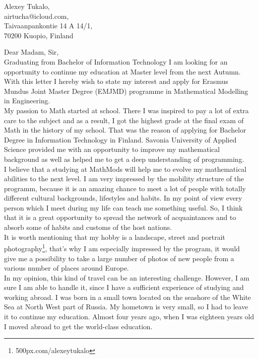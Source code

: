 \documentclass[english]{article}
\date{}
\begin{document}
\begin{flushright}
Alexey Tukalo,\\
airtucha@icloud.com,\\
Taivaanpankontie 14 A 14/1,\\
70200 Kuopio, Finland
\end{flushright}

Dear Madam, Sir,\\ 

Graduating from Bachelor of Information Technology I am looking for an opportunity to continue my education at Master level from the next Autumn. With this letter I hereby wish to state my interest and apply for Erasmus Mundus Joint Master Degree (EMJMD) programme in Mathematical Modelling in Engineering.\\

My passion to Math started at school. There I was inspired to pay a lot of extra care to the subject and as a result, I got the highest grade at the final exam of Math in the history of my school. That was the reason of applying for Bachelor Degree in Information Technology in Finland. Savonia University of Applied Science provided me with an opportunity to improve my mathematical background as well as helped me to get a deep understanding of programming.\\

I believe that a studying at MathMods will help me to evolve my mathematical abilities to the next level. I am very impressed by the mobility structure of the programm, because it is an amazing chance to meet a lot of people with totally different cultural backgrounds, lifestyles and habits. In my point of view every person which I meet during my life can teach me something useful. So, I think that it is a great opportunity to spread the network of acquaintances and to absorb some of habits and customs of the host nations.\\

It is worth mentioning that my hobby is a landscape, street and portrait photography\footnote{500px.com/alexeytukalo}, that’s why I am especially impressed by the program, it would give me a possibility to take a large number of photos of new people from a various number of places around Europe.\\

In my opinion, this kind of travel can be an interesting challenge. However, I am sure I am able to handle it, since I have a sufficient experience of studying and working abroad. I was born in a small town located on the seashore of the White Sea at North West part of Russia. My hometown is very small, so I had to leave it to continue my education. Almost four years ago, when I was eighteen years old I moved abroad to get the world-class education.\\
\end{document}

